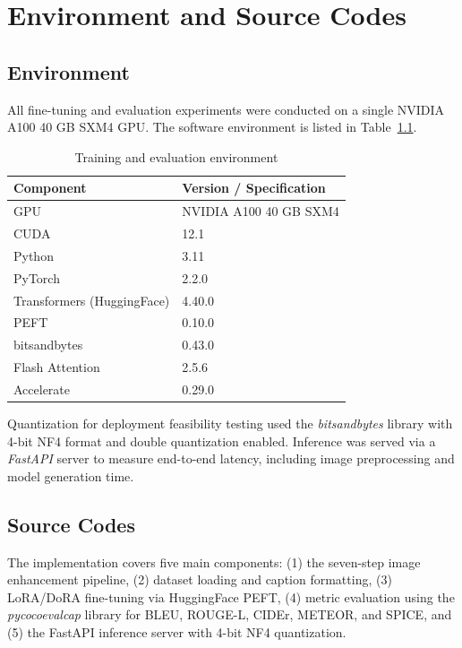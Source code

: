 

\chapter{Environment and Source Codes} \label{app:env}

\section{Environment}

All fine-tuning and evaluation experiments were conducted on a single NVIDIA A100 40 GB SXM4 GPU. The software environment is listed in Table~\ref{tab:env}.

\begin{table}[h!]
\centering
\caption{Training and evaluation environment}
\label{tab:env}
\begin{tabular}{ll}
\hline
\textbf{Component} & \textbf{Version / Specification} \\
\hline
GPU                        & NVIDIA A100 40 GB SXM4 \\
CUDA                       & 12.1 \\
Python                     & 3.11 \\
PyTorch                    & 2.2.0 \\
Transformers (HuggingFace) & 4.40.0 \\
PEFT                       & 0.10.0 \\
bitsandbytes               & 0.43.0 \\
Flash Attention            & 2.5.6 \\
Accelerate                 & 0.29.0 \\
\hline
\end{tabular}
\end{table}

Quantization for deployment feasibility testing used the \textit{bitsandbytes} library with 4-bit NF4 format and double quantization enabled. Inference was served via a \textit{FastAPI} server to measure end-to-end latency, including image preprocessing and model generation time.

\section{Source Codes}

The implementation covers five main components: (1) the seven-step image enhancement pipeline, (2) dataset loading and caption formatting, (3) LoRA/DoRA fine-tuning via HuggingFace PEFT, (4) metric evaluation using the \textit{pycocoevalcap} library for BLEU, ROUGE-L, CIDEr, METEOR, and SPICE, and (5) the FastAPI inference server with 4-bit NF4 quantization.


